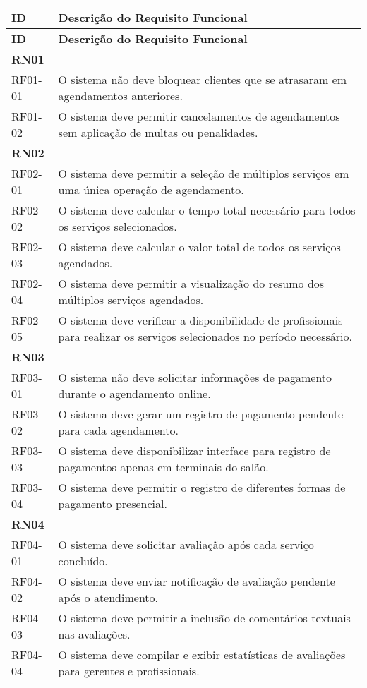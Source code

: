 \begin{longtable}{|p{}|p{}|}
	\hline
	\textbf{ID} & \textbf{Descrição do Requisito Funcional} \\
	\hline
	\endfirsthead
	
	\hline
	\textbf{ID} & \textbf{Descrição do Requisito Funcional} \\
	\hline
	\endhead
	
	\multicolumn{2}{|l|}{\textbf{RN01}} \\ \hline
	RF01-01 & O sistema não deve bloquear clientes que se atrasaram em agendamentos anteriores. \\ \hline
	RF01-02 & O sistema deve permitir cancelamentos de agendamentos sem aplicação de multas ou penalidades. \\ \hline
	
	\multicolumn{2}{|l|}{\textbf{RN02}} \\ \hline
	RF02-01 & O sistema deve permitir a seleção de múltiplos serviços em uma única operação de agendamento. \\ \hline
	RF02-02 & O sistema deve calcular o tempo total necessário para todos os serviços selecionados. \\ \hline
	RF02-03 & O sistema deve calcular o valor total de todos os serviços agendados. \\ \hline
	RF02-04 & O sistema deve permitir a visualização do resumo dos múltiplos serviços agendados. \\ \hline
	RF02-05 & O sistema deve verificar a disponibilidade de profissionais para realizar os serviços selecionados no período necessário. \\ \hline
	
	\multicolumn{2}{|l|}{\textbf{RN03}} \\ \hline
	RF03-01 & O sistema não deve solicitar informações de pagamento durante o agendamento online. \\ \hline
	RF03-02 & O sistema deve gerar um registro de pagamento pendente para cada agendamento. \\ \hline
	RF03-03 & O sistema deve disponibilizar interface para registro de pagamentos apenas em terminais do salão. \\ \hline
	RF03-04 & O sistema deve permitir o registro de diferentes formas de pagamento presencial. \\ \hline
	
	\multicolumn{2}{|l|}{\textbf{RN04}} \\ \hline
	RF04-01 & O sistema deve solicitar avaliação após cada serviço concluído. \\ \hline
	RF04-02 & O sistema deve enviar notificação de avaliação pendente após o atendimento. \\ \hline
	RF04-03 & O sistema deve permitir a inclusão de comentários textuais nas avaliações. \\ \hline
	RF04-04 & O sistema deve compilar e exibir estatísticas de avaliações para gerentes e profissionais. \\ \hline
	

\end{longtable}
